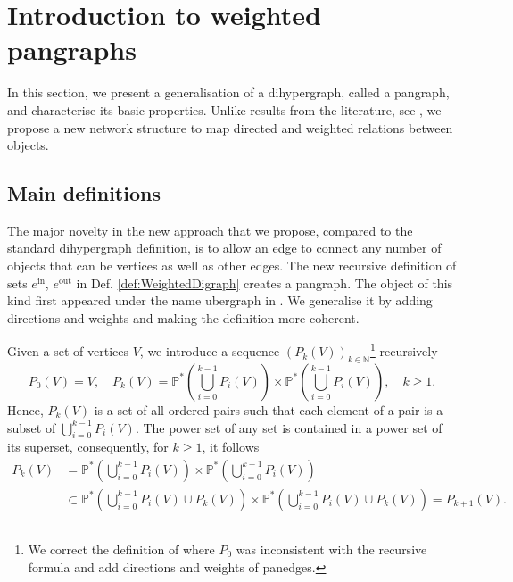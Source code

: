 \documentclass[a4paper,12pt]{article}
\theoremstyle{definition}
\theoremstyle{remark}
\newcommand{\tin}{\mathrm{in}}
\newcommand{\out}{\mathrm{out}}
\newcommand{\NN}{\mathbb{N}}
\begin{document}
\section{Introduction to weighted pangraphs}\label{sec:pangraph}

 In this section, we present a generalisation of a dihypergraph, called a pangraph, and characterise its basic properties. Unlike results from the literature, see \protect\cite{Joslyn2017_ubergraph}, we propose a new network structure to map directed and weighted relations between objects.
 
\subsection{Main definitions} 

The major novelty in the new approach that we propose, compared to the standard dihypergraph definition, is to allow an edge to connect any number of objects that can be vertices as well as other edges. The new recursive definition of sets $e^{\tin}$, $e^{\out}$ in Def. \ref{def:WeightedDigraph} creates a pangraph. The object of this kind first appeared under the name ubergraph in \protect\cite{Joslyn2017_ubergraph}. We generalise it by adding directions and weights and making the definition more coherent. 

Given a set of vertices $V$, we introduce a sequence $(P_k(V))_{k\in \NN}$\footnote{We correct the definition of \protect\cite{Joslyn2017_ubergraph} where $P_0$ was inconsistent with the recursive formula and add directions and weights of panedges.} recursively 
\begin{equation}
       P_0(V) = V, \quad P_{k}(V) =\mathbb{P}^* \left( \bigcup_{i=0}^{k-1} P_i(V)\right) \times \mathbb{P}^* \left(\bigcup_{i=0}^{k-1} P_i(V)\right) , \quad k\geq 1.
\end{equation}
Hence, $P_k(V)$ is a set of all ordered pairs such that each element of a pair is a subset of $ \bigcup_{i=0}^{k-1} P_i(V)$. The power set of any set is contained in a power set of its superset, consequently, for $k\geq 1$, it follows %
\begin{align*}
    P_k(V)&=\mathbb{P}^* \left( \bigcup_{i=0}^{k-1} P_i(V)\right) \times \mathbb{P}^* \left(\bigcup_{i=0}^{k-1} P_i(V)\right) \\
    &\subset \mathbb{P}^* \left( \bigcup_{i=0}^{k-1} P_i(V) \cup P_k(V) \right) \times \mathbb{P}^* \left(\bigcup_{i=0}^{k-1} P_i(V) \cup P_k(V) \right)=P_{k+1}(V).
\end{align*}
\end{document}
